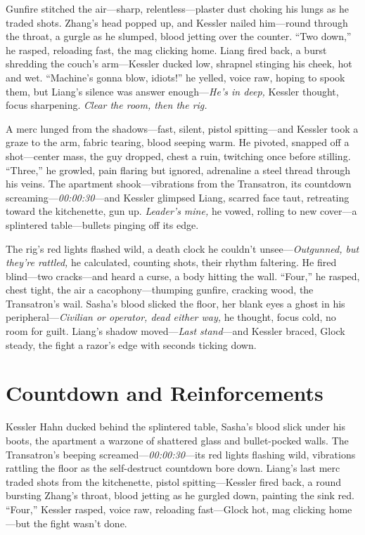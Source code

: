 \documentclass[12pt]{book}
\begin{document}
Gunfire stitched the air—sharp, relentless—plaster dust choking his lungs as he traded shots. Zhang’s head popped up, and Kessler nailed him—round through the throat, a gurgle as he slumped, blood jetting over the counter. “Two down,” he rasped, reloading fast, the mag clicking home. Liang fired back, a burst shredding the couch’s arm—Kessler ducked low, shrapnel stinging his cheek, hot and wet. “Machine’s gonna blow, idiots!” he yelled, voice raw, hoping to spook them, but Liang’s silence was answer enough—\textit{He’s in deep,} Kessler thought, focus sharpening. \textit{Clear the room, then the rig.}

A merc lunged from the shadows—fast, silent, pistol spitting—and Kessler took a graze to the arm, fabric tearing, blood seeping warm. He pivoted, snapped off a shot—center mass, the guy dropped, chest a ruin, twitching once before stilling. “Three,” he growled, pain flaring but ignored, adrenaline a steel thread through his veins. The apartment shook—vibrations from the Transatron, its countdown screaming—\textit{00:00:30}—and Kessler glimpsed Liang, scarred face taut, retreating toward the kitchenette, gun up. \textit{Leader’s mine,} he vowed, rolling to new cover—a splintered table—bullets pinging off its edge.

The rig’s red lights flashed wild, a death clock he couldn’t unsee—\textit{Outgunned, but they’re rattled,} he calculated, counting shots, their rhythm faltering. He fired blind—two cracks—and heard a curse, a body hitting the wall. “Four,” he rasped, chest tight, the air a cacophony—thumping gunfire, cracking wood, the Transatron’s wail. Sasha’s blood slicked the floor, her blank eyes a ghost in his peripheral—\textit{Civilian or operator, dead either way,} he thought, focus cold, no room for guilt. Liang’s shadow moved—\textit{Last stand}—and Kessler braced, Glock steady, the fight a razor’s edge with seconds ticking down.

\section{Countdown and Reinforcements}

Kessler Hahn ducked behind the splintered table, Sasha’s blood slick under his boots, the apartment a warzone of shattered glass and bullet-pocked walls. The Transatron’s beeping screamed—\textit{00:00:30}—its red lights flashing wild, vibrations rattling the floor as the self-destruct countdown bore down. Liang’s last merc traded shots from the kitchenette, pistol spitting—Kessler fired back, a round bursting Zhang’s throat, blood jetting as he gurgled down, painting the sink red. “Four,” Kessler rasped, voice raw, reloading fast—Glock hot, mag clicking home—but the fight wasn’t done.
\end{document}
